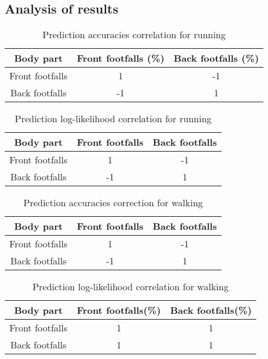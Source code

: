 \subsection{Analysis of results}

\begin{table}[h!] 
	\centering
	\begin{tabular}{ |c|c|c|} 	
		\hline	
		\textbf{Body part} & \textbf{Front footfalls (\%)} &  \textbf{Back footfalls (\%)}\\ 
		\hline
		Front footfalls & 1 & -1\\ 
		\hline
		Back footfalls & -1 & 1 \\ 
		\hline	   	
	\end{tabular}
	\caption{Prediction accuracies correlation for running}
	\label{tab:front-back-run-acc-corr}
\end{table}

\begin{table}[h!] 
	\centering
	\begin{tabular}{ |c|c|c|} 	
		\hline	
		\textbf{Body part} & \textbf{Front footfalls} &  \textbf{Back footfalls}\\ 
		\hline
		Front footfalls & 1 & -1\\ 
		\hline
		Back footfalls & -1 & 1 \\ 
		\hline	   	
	\end{tabular}
	\caption{Prediction log-likelihood correlation for running}
	\label{tab:front-back-run-log-corr}
\end{table}


\begin{table}[h!] 
	\centering
	\begin{tabular}{ |c|c|c|} 	
		\hline	
		\textbf{Body part} & \textbf{Front footfalls} &  \textbf{Back footfalls}\\ 
		\hline
		Front footfalls &  1 & -1\\ 
		\hline
		Back footfalls & -1 & 1 \\ 
		\hline	   	
	\end{tabular}
	\caption{Prediction accuracies correction for walking}
	\label{tab:front-back-walk-acc-corr}
\end{table}

\begin{table}[h!] 
	\centering
	\begin{tabular}{ |c|c|c|} 	
		\hline	
		\textbf{Body part} & \textbf{Front footfalls(\%)} &  \textbf{Back footfalls(\%)}\\ 
		\hline
		Front footfalls & 1 & 1\\ 
		\hline
		Back footfalls & 1 & 1\\ 
		\hline	   	
	\end{tabular}
	\caption{Prediction log-likelihood correlation for walking}
	\label{tab:front-back-walk-log-corr}
\end{table}


